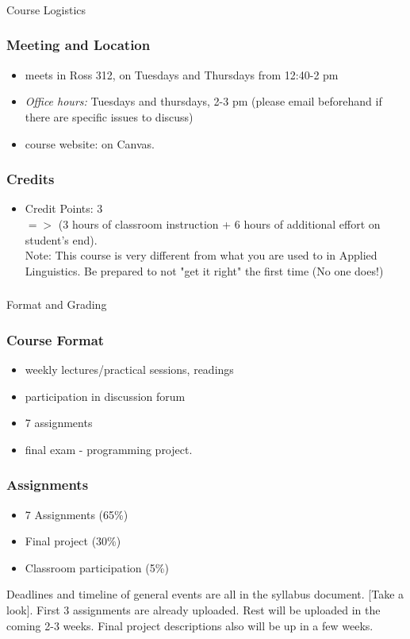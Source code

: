 \documentclass{beamer}
\begin{document}
\begin{frame}
\frametitle{}
\begin{center}
\Large Course Logistics
\end{center}
\end{frame}

\begin{frame}
\frametitle{Meeting and Location}
\begin{itemize}
\item  meets in Ross 312, on Tuesdays and Thursdays from 12:40-2 pm
\item \textit{Office hours:} Tuesdays and thursdays, 2-3 pm (please email beforehand if there are specific issues to discuss)
\item course website: on Canvas.
\end{itemize}
\end{frame}

\begin{frame}
\frametitle{Credits}
\begin{itemize}\vspace*{-.8\baselineskip}\itemsep0ex
\item Credit Points: 3
\\ $=>$ (3 hours of classroom instruction + 6 hours of additional effort on student's end). \\
Note: This course is very different from what you are used to in Applied Linguistics. Be prepared to not "get it right" the first time (No one does!)
\end{itemize}
\end{frame}

\begin{frame}
\frametitle{}
\begin{center}
Format and Grading
\end{center}
\end{frame}

\begin{frame}
\frametitle{Course Format}
\begin{itemize}\itemsep2ex
\item weekly lectures/practical sessions, readings
\item participation in discussion forum
\item 7 assignments
\item final exam - programming project.
\end{itemize}
\end{frame}

\begin{frame}
\frametitle{Assignments}
\begin{itemize}
\item 7 Assignments (65\%)
\item Final project (30\%)
\item Classroom participation (5\%)
\end{itemize}
Deadlines and timeline of general events are all in the syllabus document. [Take a look]. First 3 assignments are already uploaded. Rest will be uploaded in the coming 2-3 weeks. Final project descriptions also will be up in a few weeks. 
\end{frame}
\end{document}
